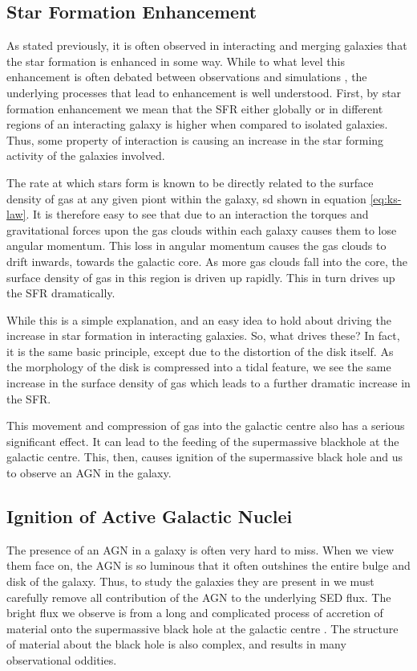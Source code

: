 \subsection{Star Formation Enhancement} 
\noindent As stated previously, it is often observed in interacting and merging galaxies that the star formation is enhanced in some way. While to what level this enhancement is often debated between observations \citep{2003ApJ...582..668B, 2008MNRAS.385.1903L, 2011MNRAS.412..591P, 2022ApJS..261...34H} and simulations \citep{2007A&A...468...61D, 2008MNRAS.384..386C, 2013MNRAS.430.1901H, 2021MNRAS.503.3113M}, the underlying processes that lead to enhancement is well understood. First, by star formation enhancement we mean that the SFR either globally or in different regions of an interacting galaxy is higher when compared to isolated galaxies. Thus, some property of interaction is causing an increase in the star forming activity of the galaxies involved. 

The rate at which stars form is known to be directly related to the surface density of gas at any given piont within the galaxy, sd shown in equation \ref{eq:ks-law}. It is therefore easy to see that due to an interaction the torques and gravitational forces upon the gas clouds within each galaxy causes them to lose angular momentum. This loss in angular momentum causes the gas clouds to drift inwards, towards the galactic core. As more gas clouds fall into the core, the surface density of gas in this region is driven up rapidly. This in turn drives up the SFR dramatically.

While this is a simple explanation, and an easy idea to hold about driving the increase in star formation in interacting galaxies. So, what drives these? In fact, it is the same basic principle, except due to the distortion of the disk itself. As the morphology of the disk is compressed into a tidal feature, we see the same increase in the surface density of gas which leads to a further dramatic increase in the SFR. 

This movement and compression of gas into the galactic centre also has a serious significant effect. It can lead to the feeding of the supermassive blackhole at the galactic centre. This, then, causes ignition of the supermassive black hole and us to observe an AGN in the galaxy.

\subsection{Ignition of Active Galactic Nuclei}
\noindent The presence of an AGN in a galaxy is often very hard to miss. When we view them face on, the AGN is so luminous that it often outshines the entire bulge and disk of the galaxy. Thus, to study the galaxies they are present in we must carefully remove all contribution of the AGN to the underlying SED flux. The bright flux we observe is from a long and complicated process of accretion of material onto the supermassive black hole at the galactic centre \citep[for an excellent breakdown of the structure and evolution of AGN see][]{2012agn..book.....B}. The structure of material about the black hole is also complex, and results in many observational oddities. 

